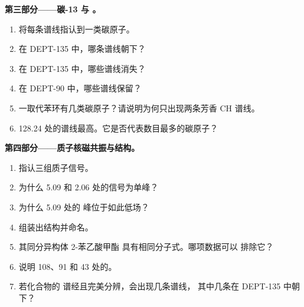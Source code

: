\begin{problem}
\medskip
\noindent\textbf{第三部分——碳-13 与 。}
\begin{enumerate}[resume]
  \item 将每条谱线指认到一类碳原子。
  \item 在 DEPT-135 中，哪条谱线朝下？
  \item 在 DEPT-135 中，哪些谱线消失？
  \item 在 DEPT-90 中，哪些谱线保留？
  \item 一取代苯环有几类碳原子？请说明为何只出现两条芳香
        CH 谱线。
  \item 128.24 处的谱线最高。它是否代表数目最多的碳原子？
\end{enumerate}

\medskip
\noindent\textbf{第四部分——质子核磁共振与结构。}
\begin{enumerate}[resume]
  \item 指认三组质子信号。
  \item 为什么 5.09 和 2.06 处的信号为单峰？
  \item 为什么 5.09 处的  峰位于如此低场？
  \item 组装出结构并命名。
  \item 其同分异构体 2-苯乙酸甲酯  具有相同分子式。哪项数据可以
        排除它？
  \item 说明 108、91 和 43 处的。
  \item 若化合物的  谱经且完美分辨，会出现几条谱线，
        其中几条在 DEPT-135 中朝下？
\end{enumerate}
\end{problem}
